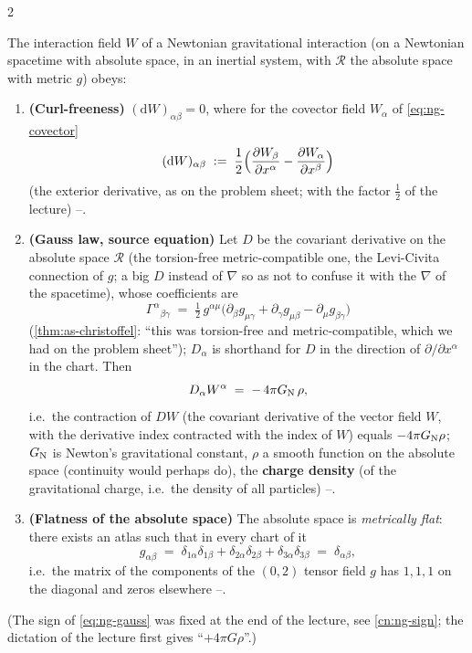 \begin{paracol}{2}
\begin{definition}\label{def:ng-equations}
The interaction field $W$ of a Newtonian gravitational interaction (on a Newtonian spacetime with absolute space, in an inertial system, with $\mathcal R$ the absolute space with metric $g$) obeys:
\begin{enumerate}
  \item \textbf{(Curl-freeness)} $(\mathrm dW)_{\alpha\beta}=0$, where for the covector field $W_\alpha$ of \eqref{eq:ng-covector}
        \begin{equation}\label{eq:ng-curl}
          (\mathrm dW)_{\alpha\beta}\;:=\;\frac12\Bigl(\frac{\partial W_\beta}{\partial x^\alpha}-\frac{\partial W_\alpha}{\partial x^\beta}\Bigr)
        \end{equation}
        (the exterior derivative, as on the problem sheet; with the factor $\tfrac12$ of the lecture) --.
  \item \textbf{(Gauss law, source equation)} Let $D$ be the covariant derivative on the absolute space $\mathcal R$ (the torsion-free metric-compatible one, the Levi-Civita connection of $g$; a big $D$ instead of $\nabla$ so as not to confuse it with the $\nabla$ of the spacetime), whose coefficients are
        \[
          \Gamma^\alpha{}_{\beta\gamma}\;=\;\tfrac12\,g^{\alpha\mu}\bigl(\partial_\beta g_{\mu\gamma}+\partial_\gamma g_{\mu\beta}-\partial_\mu g_{\beta\gamma}\bigr)
        \]
        (\cref{thm:as-christoffel}: ``this was torsion-free and metric-compatible, which we had on the problem sheet''); $D_\alpha$ is shorthand for $D$ in the direction of $\partial/\partial x^\alpha$ in the chart. Then
        \begin{equation}\label{eq:ng-gauss}
          D_\alpha W^\alpha\;=\;-\,4\pi G_{\rm N}\,\rho ,
        \end{equation}
        i.e.\ the contraction of $DW$ (the covariant derivative of the vector field $W$, with the derivative index contracted with the index of $W$) equals $-4\pi G_{\rm N}\rho$; $G_{\rm N}$ is Newton's gravitational constant, $\rho$ a smooth function on the absolute space (continuity would perhaps do), the \textbf{charge density}
        (of the gravitational charge, i.e.\ the density of all particles) --.
  \item \textbf{(Flatness of the absolute space)} The absolute space is \emph{metrically flat}: there exists an atlas such that in every chart of it
        \begin{equation}\label{eq:ng-flat}
          g_{\alpha\beta}\;=\;\delta_{1\alpha}\delta_{1\beta}+\delta_{2\alpha}\delta_{2\beta}+\delta_{3\alpha}\delta_{3\beta}\;=\;\delta_{\alpha\beta} ,
        \end{equation}
        i.e.\ the matrix of the components of the $(0,2)$ tensor field $g$ has $1,1,1$ on the diagonal and zeros elsewhere --.
\end{enumerate}
(The sign of \eqref{eq:ng-gauss} was fixed at the end of the lecture, see \cref{cn:ng-sign}; the dictation of the lecture first gives ``$+4\pi G\rho$''.)
\end{definition}


\end{paracol}
